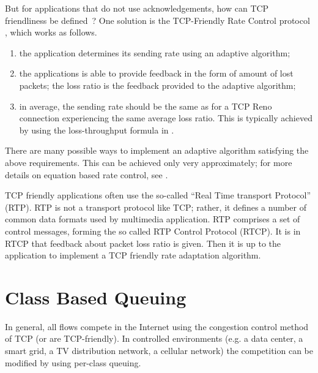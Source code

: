 But for
applications that do not use acknowledgements, how can TCP friendliness be defined~? One solution is the TCP-Friendly Rate Control protocol \cite{tfrc2008rfc}, which works as follows.
  \begin{enumerate}
    \item the application determines its sending rate using an
    adaptive algorithm;

        \item  the applications is able to provide feedback in the form of
        amount of lost packets; the loss ratio is the feedback provided to
        the adaptive algorithm;

        \item in average, the sending rate should be the same as for a TCP Reno
        connection experiencing the same average loss ratio. This is typically achieved by using the loss-throughput formula in .
  \end{enumerate}

There are many possible ways to implement an adaptive algorithm
satisfying the above requirements. This can be achieved only very
approximately; for more details on equation based rate control,
see \cite{Vojnovic2002mAugust}.

TCP friendly applications often use the so-called ``Real
Time transport Protocol'' (RTP). RTP is not a transport protocol like
TCP; rather, it defines a number of common data formats used by
multimedia application. RTP comprises a set of control messages,
forming the so called RTP Control Protocol (RTCP). It is in RTCP that
feedback about packet loss ratio is given. Then it is up to the
application to implement a TCP friendly rate adaptation algorithm.

\section{Class Based Queuing}
In general, all flows compete in the Internet using the congestion control method of TCP (or are TCP-friendly). In controlled environments (e.g. a data center,  a smart grid, a TV distribution network, a cellular network) the competition can be modified by using per-class queuing.

